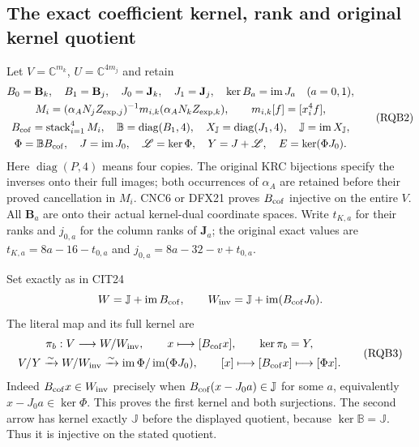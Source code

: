\documentclass[11pt,a4paper]{article}
\begin{document}
\subsection{The exact coefficient kernel, rank and original kernel quotient}

Let $V=\mathbb C^{m_k}$, $U=\mathbb C^{4m_j}$ and retain
\[
\begin{gathered}
 B_0=\mathbf B_k,\quad B_1=\mathbf B_j,\quad
 J_0=\mathbf J_k,\quad J_1=\mathbf J_j,\quad
 \ker B_a=\operatorname{im}J_a\quad(a=0,1),\\
 M_i=(\alpha_A N_jZ_{\exp,j})^{-1}
          m_{i,k}(\alpha_A N_kZ_{\exp,k}),\qquad m_{i,k}[f]=[x_i^4f],\\
 B_{\rm cof}=\operatorname{stack}_{i=1}^4M_i,\quad
 \mathbb B=\operatorname{diag}(B_1,4),\quad
 X_{\mathbb J}=\operatorname{diag}(J_1,4),\quad
 \mathbb J=\operatorname{im}X_{\mathbb J},\\
 \Phi=\mathbb B B_{\rm cof},\quad J=\operatorname{im}J_0,\quad
 \mathscr L=\ker\Phi,\quad Y=J+\mathscr L,\quad
 E=\ker(\Phi J_0).
\end{gathered}\tag{RQB2}
\]
Here $\operatorname{diag}(P,4)$ means four copies. The original KRC
bijections specify the inverses onto their full images; both occurrences
of $\alpha_A$ are retained before their proved cancellation in $M_i$.
CNC6 or DFX21 proves $B_{\rm cof}$ injective on the entire $V$.
All $\mathbf B_a$ are onto their actual kernel-dual coordinate spaces.
Write $t_{K,a}$ for their ranks and $j_{0,a}$ for the column ranks of
$\mathbf J_a$; the original exact values are
$t_{K,a}=8a-16-t_{0,a}$ and $j_{0,a}=8a-32-v+t_{0,a}$.

Set exactly as in CIT24
\[
 W=\mathbb J+\operatorname{im}B_{\rm cof},\qquad
 W_{\rm inv}=\mathbb J+\operatorname{im}(B_{\rm cof}J_0).
\]
The literal map and its full kernel are
\[
\begin{gathered}
 \pi_b:V\longrightarrow W/W_{\rm inv},\qquad
                 x\longmapsto[B_{\rm cof}x],\qquad \ker\pi_b=Y,\\
 V/Y\xrightarrow{\sim}W/W_{\rm inv}
 \xrightarrow{\sim}\operatorname{im}\Phi/\operatorname{im}(\Phi J_0),
 \qquad [x]\longmapsto[B_{\rm cof}x]\longmapsto[\Phi x].
\end{gathered}\tag{RQB3}
\]
Indeed $B_{\rm cof}x\in W_{\rm inv}$ precisely when
$B_{\rm cof}(x-J_0a)\in\mathbb J$ for some $a$, equivalently
$x-J_0a\in\ker\Phi$. This proves the first kernel and both
surjections. The second arrow has kernel exactly $\mathbb J$
before the displayed quotient, because $\ker\mathbb B=\mathbb J$.
Thus it is injective on the stated quotient.
\end{document}
